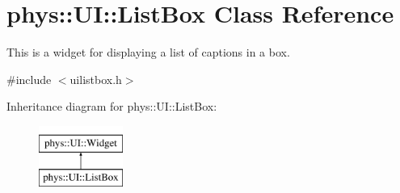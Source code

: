 \hypertarget{classphys_1_1UI_1_1ListBox}{
\section{phys::UI::ListBox Class Reference}
\label{d0/d28/classphys_1_1UI_1_1ListBox}
}


This is a widget for displaying a list of captions in a box.  




{\ttfamily \#include $<$uilistbox.h$>$}

Inheritance diagram for phys::UI::ListBox:\begin{figure}[H]
\begin{center}
\leavevmode
\includegraphics[height=2cm]{d0/d28/classphys_1_1UI_1_1ListBox}
\end{center}
\end{figure}
